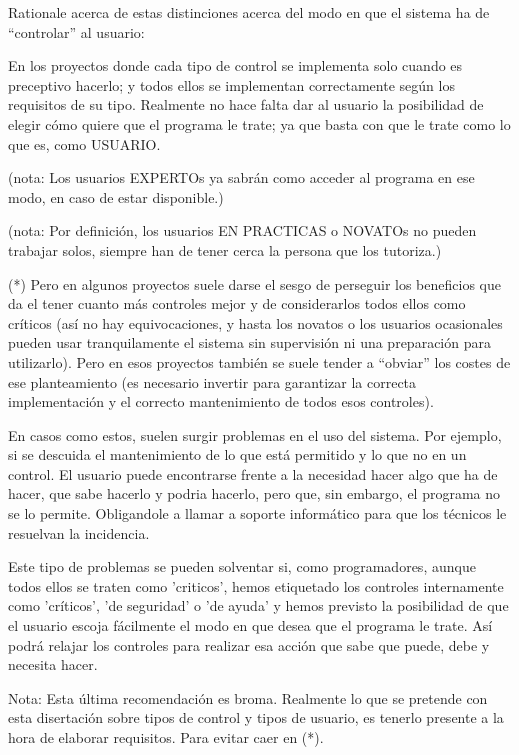 \documentclass[spanish,12pt,a4paper,final,oneside]{book}
\begin{document}
Rationale acerca de estas distinciones acerca del modo en que el sistema ha de ``controlar'' al usuario:

En los proyectos donde cada tipo de control se implementa solo cuando es preceptivo hacerlo; y todos ellos se implementan correctamente según los requisitos de su tipo. Realmente no hace falta dar al usuario la posibilidad de elegir cómo quiere que el programa le trate; ya que basta con que le trate como lo que es, como USUARIO.

(nota: Los usuarios EXPERTOs ya sabrán como acceder al programa en ese modo, en caso de estar disponible.) 

(nota: Por definición, los usuarios EN PRACTICAS o NOVATOs no pueden trabajar solos, siempre han de tener cerca la persona que los tutoriza.)

(*) Pero en algunos proyectos suele darse el sesgo de perseguir los beneficios que da el tener cuanto más controles mejor y de considerarlos todos ellos como críticos (así no hay equivocaciones, y hasta los novatos o los usuarios ocasionales pueden usar tranquilamente el sistema sin supervisión ni una preparación para utilizarlo). Pero en esos proyectos también se suele tender a ``obviar'' los costes de ese planteamiento (es necesario invertir para garantizar la correcta implementación y el correcto mantenimiento de todos esos controles).

En casos como estos, suelen surgir problemas en el uso del sistema. Por ejemplo, si se descuida el mantenimiento de lo que está permitido y lo que no en un control. El usuario puede encontrarse frente a la necesidad hacer algo que ha de hacer, que sabe hacerlo y podria hacerlo, pero que, sin embargo, el programa no se lo permite. Obligandole a llamar a soporte informático para que los técnicos le resuelvan la incidencia. 

Este tipo de problemas se pueden solventar si, como programadores, aunque todos ellos se traten como 'criticos', hemos etiquetado los controles internamente como 'críticos', 'de seguridad' o 'de ayuda' y hemos previsto la posibilidad de que el usuario escoja fácilmente el modo en que desea que el programa le trate. Así podrá relajar los controles para realizar esa acción que sabe que puede, debe y necesita hacer.

Nota: Esta última recomendación es broma. Realmente lo que se pretende con esta disertación sobre tipos de control y tipos de usuario, es tenerlo presente a la hora de elaborar requisitos. Para evitar caer en (*).
\end{document}
